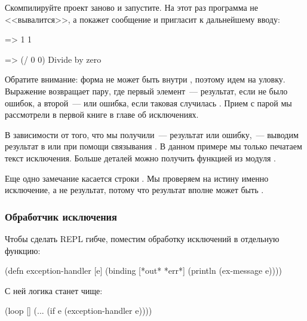 Скомпилируйте проект заново и запустите. На этот раз программа не <<вывалится>>, а покажет сообщение и пригласит к дальнейшему вводу:

\begin{english}
  \begin{clojure}
=> 1
1

=> (/ 0 0)
Divide by zero
  \end{clojure}
\end{english}


Обратите внимание: форма  не может быть внутри , поэтому идем на уловку. Выражение  возвращает пару, где первый элемент~--- результат, если не было ошибок, а второй~---  или ошибка, если таковая случилась . Прием с парой мы рассмотрели в первой книге в главе об исключениях.

В зависимости от того, что мы получили~--- результат или ошибку,~--- выводим результат в  или  при помощи связывания . В данном примере мы только печатаем текст исключения. Больше деталей можно получить функцией  из модуля .


Еще одно замечание касается строки  . Мы проверяем на истину именно исключение, а не результат, потому что результат вполне может быть .

\subsubsection{Обработчик исключения}

Чтобы сделать REPL гибче, поместим обработку исключений в отдельную функцию:

\begin{english}
  \begin{clojure}
(defn exception-handler [e]
  (binding [*out* *err*]
    (println (ex-message e))))
  \end{clojure}
\end{english}

С ней логика  станет чище:

\begin{english}
  \begin{clojure}
(loop []
  (...
   (if e
     (exception-handler e))))
  \end{clojure}
\end{english}

